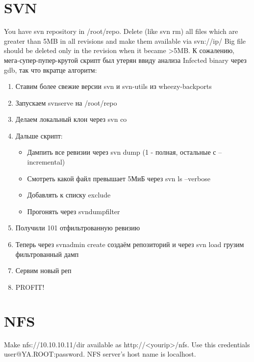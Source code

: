 \documentclass[a4paper,10pt]{report}
\begin{document}
\chapter{SVN}
You have svn repository in /root/repo. Delete (like svn rm) all files which are greater than 5MB in all revisions and make them available via svn://ip/
\newline
Big file should be deleted only in the revision when it became >5MB.
\newline\newline
К сожалению, мега-супер-пупер-крутой скрипт был утерян ввиду анализа Infected binary через gdb, так что вкратце алгоритм:
\begin{enumerate}
  \item Ставим более свежие версии svn и svn-utils из wheezy-backports
  \item Запускаем svnserve на /root/repo
  \item Делаем локальный клон через svn co
  \item Дальше скрипт:
  \begin{itemize}
    \item Дампить все ревизии через svn dump (1 - полная, остальные с --incremental)
    \item Смотреть какой файл превышает 5МиБ через svn ls --verbose
    \item Добавлять к списку exclude
    \item Прогонять через svndumpfilter
  \end{itemize}
  \item Получили 101 отфильтрованную ревизию
  \item Теперь через svnadmin create создаём репозиторий и через svn load грузим фильтрованный дамп
  \item Сервим новый реп
  \item PROFIT!
\end{enumerate}

\chapter{NFS}
Make nfs://10.10.10.11/dir available as http://<yourip>/nfs. Use this credentials user@YA.ROOT:password. NFS server's host name is localhost.
\newline\newline
\end{document}
